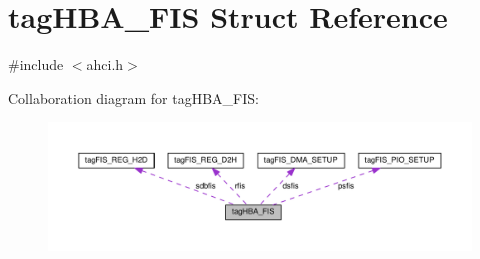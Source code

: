 \hypertarget{structtagHBA__FIS}{}\section{tag\+H\+B\+A\+\_\+\+F\+IS Struct Reference}
\label{structtagHBA__FIS}


{\ttfamily \#include $<$ahci.\+h$>$}



Collaboration diagram for tag\+H\+B\+A\+\_\+\+F\+IS\+:
\nopagebreak
\begin{figure}[H]
\begin{center}
\leavevmode
\includegraphics[width=350pt]{structtagHBA__FIS__coll__graph}
\end{center}
\end{figure}
